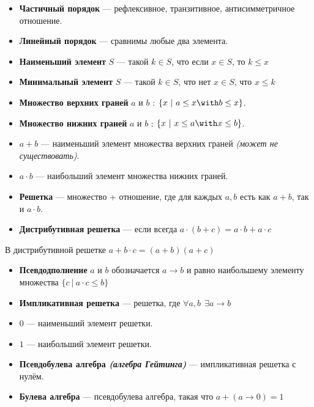 \begin{definition}\itemfix
    \begin{itemize}
        \item \textbf{Частичный порядок} --- рефлексивное, транзитивное, антисимметричное отношение.
        \item \textbf{Линейный порядок} --- сравнимы любые два элемента.
        \item \textbf{Наименьший элемент} \(S\) --- такой \(k\in S\), что если \(x\in S\), то \(k \leq x\)
        \item \textbf{Минимальный элемент} \(S\) --- такой \(k\in S\), что нет \(x\in S\), что \(x \leq k\)
        \item \textbf{Множество верхних граней} \(a\) и \(b\) : \(\{x\ |\ a \leq x \with b \leq x\}\).
        \item \textbf{Множество нижних граней} \(a\) и \(b\) : \(\{x\ |\ x \leq a \with x \leq b\}\).
        \item \(a + b\) --- наименьший элемент множества верхних граней \textit{(может не существовать)}.
        \item \(a \cdot b\) --- наибольший элемент множества нижних граней.
        \item \textbf{Решетка} --- множество + отношение, где для каждых \(a,b\) есть как \(a + b\), так и \(a \cdot b\).
        \item \textbf{Дистрибутивная решетка} --- если всегда \(a\cdot(b + c) = a\cdot b + a\cdot c\)
    \end{itemize}
\end{definition}

\begin{lemma}
    В дистрибутивной решетке \(a + b\cdot c = (a + b)(a + c)\)
\end{lemma}

\begin{definition}\itemfix
    \begin{itemize}
        \item \textbf{Псевдодполнение} \(a\) и \(b\) обозначается \(a \to b\) и равно наибольшему элементу множества \(\{c\ |\ a\cdot c \leq b\}\)
        \item \textbf{Импликативная решетка} --- решетка, где \(\forall a, b \ \ \exists a \to b\)
        \item \(0\) --- наименьший элемент решетки.
        \item \(1\) --- наибольший элемент решетки.
        \item \textbf{Псевдобулева алгебра \textit{(алгебра Гейтинга)}} --- импликативная решетка с нулём.
        \item \textbf{Булева алгебра} --- псевдобулева алгебра, такая что \(a + (a \to 0) = 1\)
    \end{itemize}
\end{definition}

